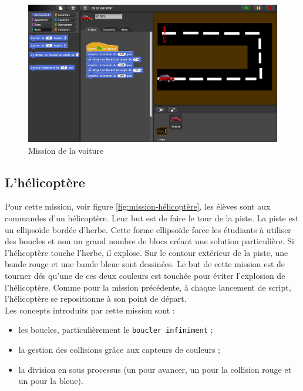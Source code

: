 \begin{figure}
  \begin{center}
    \includegraphics[width=\textwidth]{content/7-solution/1-missions/images/voiture}
    \caption{Mission de la voiture}
    \label{fig:mission-voiture}
  \end{center}
\end{figure}


\subsection{L'hélicoptère}
\label{mission-helicoptere}
Pour cette mission, voir figure \ref{fig:mission-hélicoptère}, les élèves sont aux commandes d'un hélicoptère. Leur but est de faire le tour de la piste. La piste est un ellipsoïde bordée d'herbe. Cette forme ellipsoïde force les étudiants à utiliser des boucles et non un grand nombre de \glspl{bloc} créant une solution particulière. Si l'hélicoptère touche l'herbe, il explose. Sur le contour extérieur de la piste, une bande rouge et une bande bleue sont dessinées. Le but de cette mission est de tourner dés qu'une de ces deux couleurs est touchée pour éviter l'explosion de l'hélicoptère. Comme pour la mission précédente, à chaque lancement de \gls{script}, l'hélicoptère se repositionne à son point de départ.\\

Les concepts introduits par cette mission sont :
\begin{itemize}
\item les boucles, particulièrement le \texttt{boucler infiniment} ;
\item la gestion des collisions grâce aux capteurs de couleurs ;
\item la division en sous processus (un pour avancer, un pour la collision rouge et un pour la bleue).
\end{itemize}

